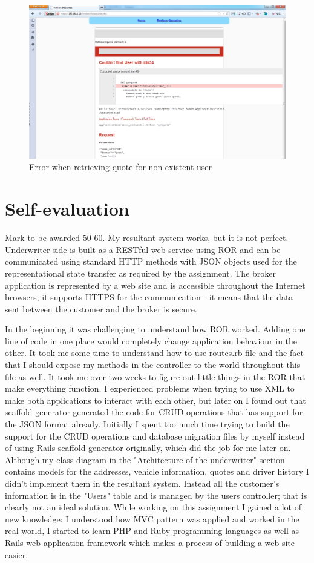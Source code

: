 \documentclass[10pt,a4paper,headinclude=true,twoside]{report}
\begin{document}
\begin{figure}[H]
\centering
\centerline{\includegraphics[scale=0.45]{./retriveQuoteError}}
\caption{Error when retrieving quote for non-existent user}
\label{fig:retriveQuoteError}
\end{figure} 
\newpage
\section{Self-evaluation}
Mark to be awarded 50-60. My resultant system works, but it is not perfect. Underwriter side is built as a RESTful web service using ROR and can be communicated using standard HTTP methods with JSON objects used for the representational state transfer as required by the assignment. The broker application is represented by a web site and is accessible throughout the Internet browsers; it supports HTTPS for the communication - it means that the data sent between the customer and the broker is secure.

In the beginning it was challenging to understand how ROR worked. Adding one line of code in one place would completely change application behaviour in the other. It took me some time to understand how to use routes.rb file and the fact that I should expose my methods in the controller to the world throughout this file as well. It took me over two weeks to figure out little things in the ROR that make everything function. I experienced problems when trying to use XML to make both applications to interact with each other, but later on I found out that scaffold generator generated the code for CRUD operations that has support for the JSON format already. Initially I spent too much time trying to build the support for the CRUD operations and database migration files by myself instead of using Rails scaffold generator originally, which did the job for me later on. Although my class diagram in the "Architecture of the underwriter" section contains models for the addresses, vehicle information, quotes and driver history I didn't implement them in the resultant system. Instead all the customer's information is in the "Users" table and is managed by the users controller; that is clearly not an ideal solution. While working on this assignment I gained a lot of new knowledge: I understood how MVC pattern was applied and worked in the real world, I started to learn PHP and Ruby programming languages as well as Rails web application framework which makes a process of building a web site easier.
\end{document}

